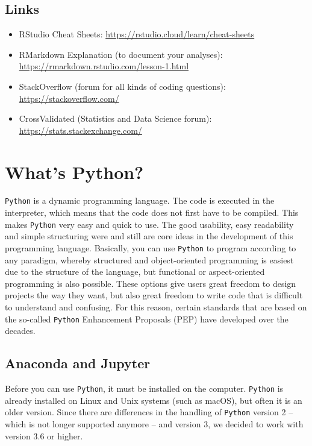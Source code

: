 \documentclass[
  11pt,
]{book}
\providecommand{\tightlist}{%
  \setlength{\itemsep}{0pt}\setlength{\parskip}{0pt}}
\begin{document}
\hypertarget{links}{%
\subsection{Links}\label{links}}

\begin{itemize}
\tightlist
\item
  RStudio Cheat Sheets: \url{https://rstudio.cloud/learn/cheat-sheets}
\item
  RMarkdown Explanation (to document your analyses): \url{https://rmarkdown.rstudio.com/lesson-1.html}
\item
  StackOverflow (forum for all kinds of coding questions): \url{https://stackoverflow.com/}
\item
  CrossValidated (Statistics and Data Science forum): \url{https://stats.stackexchange.com/}
\end{itemize}

\hypertarget{whats-python}{%
\section{What's Python?}\label{whats-python}}

\texttt{Python} is a dynamic programming language. The code is executed in the interpreter, which means that the code does not first have to be compiled. This makes \texttt{Python} very easy and quick to use. The good usability, easy readability and simple structuring were and still are core ideas in the development of this programming language.
Basically, you can use \texttt{Python} to program according to any paradigm, whereby structured and object-oriented programming is easiest due to the structure of the language, but functional or aspect-oriented programming is also possible. These options give users great freedom to design projects the way they want, but also great freedom to write code that is difficult to understand and confusing. For this reason, certain standards that are based on the so-called \texttt{Python} Enhancement Proposals (PEP) have developed over the decades.

\hypertarget{anaconda-and-jupyter}{%
\subsection{Anaconda and Jupyter}\label{anaconda-and-jupyter}}

Before you can use \texttt{Python}, it must be installed on the computer. \texttt{Python} is already installed on Linux and Unix systems (such as macOS), but often it is an older version. Since there are differences in the handling of \texttt{Python} version 2 -- which is not longer supported anymore -- and version 3, we decided to work with version 3.6 or higher.
\end{document}
